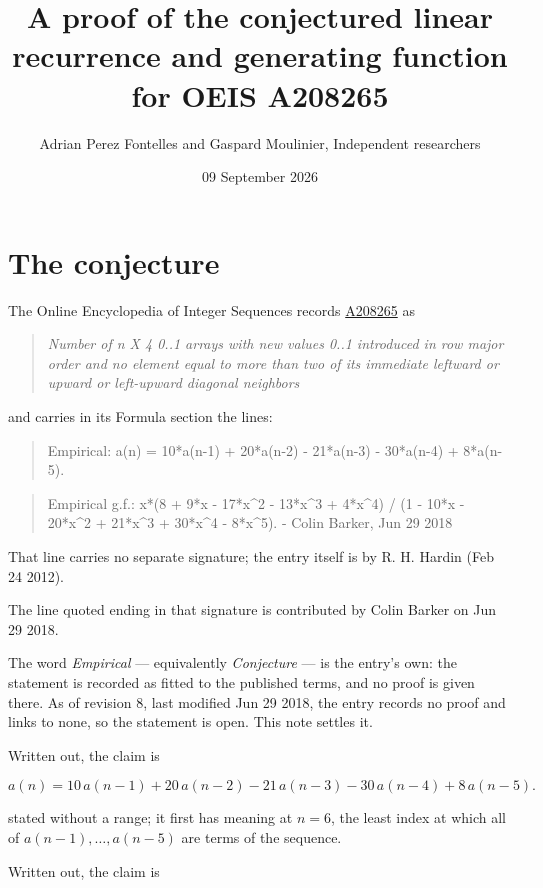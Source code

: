 \documentclass[11pt]{article}
\title{A proof of the conjectured linear recurrence and generating function for OEIS A208265}
\author{Adrian Perez Fontelles and Gaspard Moulinier, Independent researchers}
\date{09 September 2026}
\theoremstyle{definition}
\begin{document}
\maketitle
\section{The conjecture}

The Online Encyclopedia of Integer Sequences records \href{https://oeis.org/A208265}{A208265} as

\begin{quote}\itshape Number of n X 4 0..1 arrays with new values 0..1 introduced in row major order and no element equal to more than two of its immediate leftward or upward or left-upward diagonal neighbors\end{quote}

and carries in its Formula section the lines:

\begin{quote}\ttfamily Empirical: a(n) = 10*a(n-1) + 20*a(n-2) - 21*a(n-3) - 30*a(n-4) + 8*a(n-5).\end{quote}

\begin{quote}\ttfamily Empirical g.f.: x*(8 + 9*x - 17*x\textasciicircum{}2 - 13*x\textasciicircum{}3 + 4*x\textasciicircum{}4) / (1 - 10*x - 20*x\textasciicircum{}2 + 21*x\textasciicircum{}3 + 30*x\textasciicircum{}4 - 8*x\textasciicircum{}5). - Colin Barker, Jun 29 2018\end{quote}

That line carries no separate signature; the entry itself is by R. H. Hardin (Feb 24 2012).

The line quoted ending in that signature is contributed by Colin Barker on Jun 29 2018.

The word {\itshape Empirical} --- equivalently {\itshape Conjecture} --- is the entry's own: the statement is recorded as fitted to the published terms, and no proof is given there. As of revision 8, last modified Jun 29 2018, the entry records no proof and links to none, so the statement is open. This note settles it.

Written out, the claim is

\[a(n) = 10\,a(n-1) + 20\,a(n-2) - 21\,a(n-3) - 30\,a(n-4) + 8\,a(n-5).\]

stated without a range; it first has meaning at $n = 6$, the least index at which all of $a(n-1),\dots,a(n-5)$ are terms of the sequence.

Written out, the claim is
\end{document}
